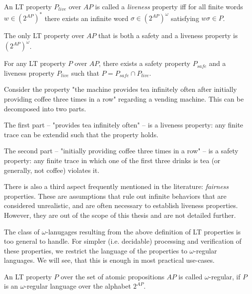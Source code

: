 \begin{definition}
	An LT property $P_{live}$ over $AP$ is called a \textit{liveness} property iff for all finite words $w \in (2^{AP})^*$ there exists an infinite word $\sigma \in (2^{AP})^\omega$ satisfying $w \sigma \in P$.
\end{definition}

\begin{theorem} 
	The only LT property over $AP$ that is both a safety and a liveness property is $(2^{AP})^\omega$. \cite{principlesofmodelchecking}
\end{theorem}

\begin{theorem}
	For any LT property $P$ over $AP$, there exists a safety property $P_{safe}$ and a liveness property $P_{live}$ such that $P = P_{safe} \cap P_{live}$. \cite{principlesofmodelchecking}
\end{theorem}

\begin{example}
	\label{ex:safetyliveness}
	Consider the property "the machine provides tea infinitely often after initially providing coffee three times in a row" regarding a vending machine. This can be decomposed into two parts.
	
	The first part -- "provides tea infinitely often" -- is a liveness property: any finite trace can be extendid such that the property holds.
	
	The second part -- "initially providing coffee three times in a row" -- is a safety property: any finite trace in which one of the first three drinks is tea (or generally, not coffee) violates it.
\end{example}


There is also a third aspect frequently mentioned in the literature: \textit{fairness} properties. These are assumptions that rule out infinite behaviors that are considered unrealistic, and are often necessary to establish liveness properties. However, they are out of the scope of this thesis and are not detailed further.

The class of $\omega$-lanugages resulting from the above definition of LT properties is too general to handle. For simpler (i.e. decidable) processing and verification of these properties, we restrict the language of the properties to $\omega$-regular languages. We will see, that this is enough in most practical use-cases.

\begin{definition}
	\label{def:omegaregprop}
	An LT property $P$ over the set of atomic propositions $AP$ is called $\omega$-regular, if $P$ is an $\omega$-regular language over the alphabet $2^{AP}$.
\end{definition}

